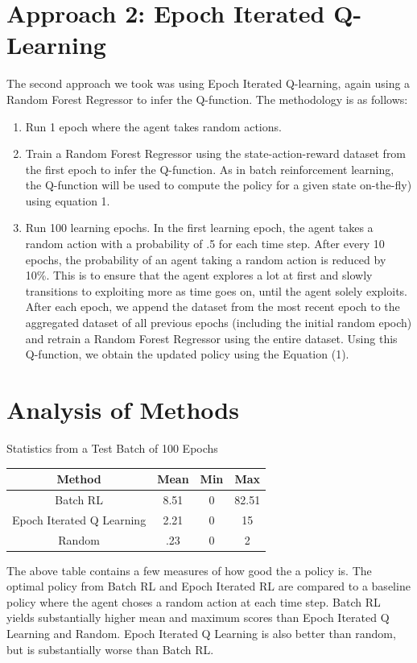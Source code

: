 \documentclass[11pt, oneside]{article}   	%
\begin{document}
\section{Approach 2: Epoch Iterated Q-Learning}
The second approach we took was using Epoch Iterated Q-learning, again using a Random Forest Regressor to infer the Q-function.  The methodology is as follows:
\begin{enumerate}
  \item Run 1 epoch where the agent takes random actions.
  \item Train a Random Forest Regressor using the state-action-reward dataset from the first epoch to infer the Q-function.  As in batch reinforcement learning, the Q-function will be used to compute the policy for a given state on-the-fly) using equation 1.
  \item Run 100 learning epochs.  In the first learning epoch, the agent takes a random action with a probability of .5 for each time step.  After every 10 epochs, the probability of an agent taking a random action is reduced by 10\%.  This is to ensure that the agent explores a lot at first and slowly transitions to exploiting more as time goes on, until the agent solely exploits.  After each epoch, we append the dataset from the most recent epoch to the aggregated dataset of all previous epochs (including the initial random epoch) and retrain a Random Forest Regressor using the entire dataset.  Using this Q-function, we obtain the updated policy using the Equation (1).
\end{enumerate}
\section{Analysis of Methods}

  \begin{center}
    Statistics from a Test Batch of 100 Epochs\\
      \vspace{3mm}
    \begin{tabular}{ | c | c | c | c | } 
      \hline
      Method & Mean & Min & Max \\ 
      \hline
      Batch RL & 8.51 & 0 & 82.51 \\ 
      \hline
      Epoch Iterated Q Learning & 2.21 & 0 & 15 \\  
      \hline
      Random & .23 & 0 & 2 \\
      \hline
    \end{tabular}
  \end{center}
  \vspace{3mm}
  The above table contains a few measures of how good the a policy is.  The optimal policy from Batch RL and Epoch Iterated RL are compared to a baseline policy where the agent choses a random action at each time step.  Batch RL yields substantially higher mean and maximum scores than Epoch Iterated Q Learning and Random.  Epoch Iterated Q Learning is also better than random, but is substantially worse than Batch RL.  \\
  
\end{document}
